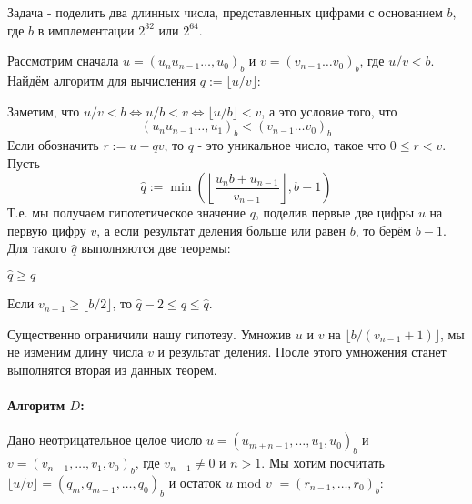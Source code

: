 \begin{itemize}
    Задача - поделить два длинных числа, представленных цифрами с основанием $b$, где $b$ в имплементации $2^{32}$ или $2^{64}$. 

   Рассмотрим сначала $u=(u_nu_{n-1}\dots,u_0)_b$ и $v=(v_{n-1}\dots v_0)_b$, где $u/v <b$. Найдём алгоритм для вычисления $q:=\lfloor u/v \rfloor$:

   Заметим, что $u/v<b\Leftrightarrow u/b < v\Leftrightarrow \lfloor u/b\rfloor < v$, а это условие того, что \[(u_nu_{n-1}\dots,u_1)_b <  (v_{n-1}\dots v_0)_b\]
   Если обозначить $r:=u - qv$, то $q$ - это уникальное число, такое что $0\leqslant r <v$. Пусть
   \[\hat{q}:=\min \left(\left\lfloor \frac{u_nb + u_{n-1}}{v_{n-1}}\right\rfloor, b-1\right)\]
   Т.е. мы получаем гипотетическое значение $q$, поделив первые две цифры $u$ на первую цифру $v$, а если результат деления больше или равен $b$, то берём $b-1$. Для такого $\hat{q}$ выполняются две теоремы: 
   \begin{theorem}
    $\hat{q}\geqslant q$
   \end{theorem}
   \begin{theorem}
     Если $v_{n-1}\geqslant \lfloor b/2\rfloor$, то $\hat{q}-2\leqslant q\leqslant \hat{q}$.
   \end{theorem}
   Существенно ограничили нашу гипотезу. Умножив $u$ и $v$ на $\lfloor b/(v_{n-1}+1)\rfloor$, мы не изменим длину числа $v$ и результат деления. После этого умножения станет выполнятся вторая из данных теорем.

   \paragraph{Алгоритм $D$:} Дано неотрицательное целое число $u = (u_{m+n-1},\dots,u_1,u_0)_b$ и $v = (v_{n-1},\dots,v_1,v_0)_b$, где $v_{n-1}\neq 0$ и $n>1$. Мы хотим посчитать $\lfloor u/v\rfloor = (q_m,q_{m-1},\dots,q_0)_b$ и остаток $u$ mod $v$ $= (r_{n-1},\dots,r_0)_b$:


\end{itemize}
